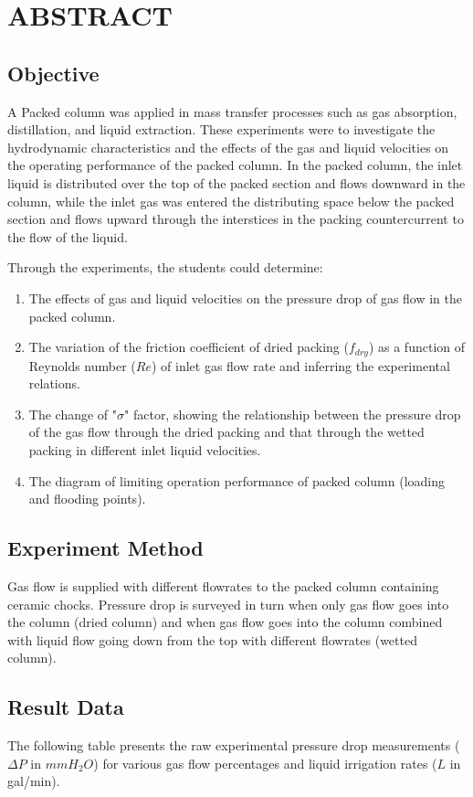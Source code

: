 \section{ABSTRACT}

\subsection{Objective}
A Packed column was applied in mass transfer processes such as gas absorption, distillation, and liquid extraction. These experiments were to investigate the hydrodynamic characteristics and the effects of the gas and liquid velocities on the operating performance of the packed column. In the packed column, the inlet liquid is distributed over the top of the packed section and flows downward in the column, while the inlet gas was entered the distributing space below the packed section and flows upward through the interstices in the packing countercurrent to the flow of the liquid.

Through the experiments, the students could determine:
\begin{enumerate}
    \item The effects of gas and liquid velocities on the pressure drop of gas flow in the packed column.
    \item The variation of the friction coefficient of dried packing ($f_{dry}$) as a function of Reynolds number ($Re$) of inlet gas flow rate and inferring the experimental relations.
    \item The change of "$\sigma$" factor, showing the relationship between the pressure drop of the gas flow through the dried packing and that through the wetted packing in different inlet liquid velocities.
    \item The diagram of limiting operation performance of packed column (loading and flooding points).
\end{enumerate}

\subsection{Experiment Method}
Gas flow is supplied with different flowrates to the packed column containing ceramic chocks. Pressure drop is surveyed in turn when only gas flow goes into the column (dried column) and when gas flow goes into the column combined with liquid flow going down from the top with different flowrates (wetted column).

\subsection{Result Data}
The following table presents the raw experimental pressure drop measurements ($\Delta P$ in $mmH_2O$) for various gas flow percentages and liquid irrigation rates ($L$ in gal/min).


